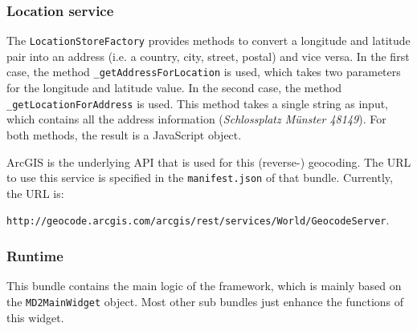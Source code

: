 \subsubsection{Location service}
The \lstinline|LocationStoreFactory| provides methods to convert a longitude and latitude pair into an address (i.e. a country, city, street, postal) and vice versa. In the first case, the method \lstinline|_getAddressForLocation| is used, which takes two parameters for the longitude and latitude value. In the second case, the method \lstinline|_getLocationForAddress| is used. This method takes a single string as input, which contains all the address information (\eg \textit{Schlossplatz M\"unster 48149}). For both methods, the result is a JavaScript object.

ArcGIS is the underlying API that is used for this (reverse-) geocoding. The URL to use this service is specified in the \lstinline|manifest.json| of that bundle. Currently, the URL is:

 \lstinline|http://geocode.arcgis.com/arcgis/rest/services/World/GeocodeServer|. 

\subsubsection{Runtime}

This bundle contains the main logic of the \MD \mapapps framework, which is mainly based on the \lstinline|MD2MainWidget| object. Most other sub bundles just enhance the functions of this widget.

